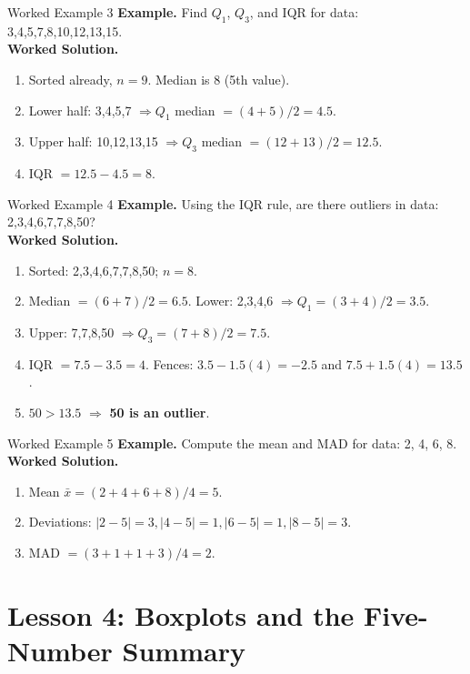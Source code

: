 \documentclass[aspectratio=169]{beamer}
\newcommand{\exampletitle}[1]{\vspace{0.25em}\textbf{Example.} #1\vspace{0.25em}}
\newcommand{\worked}{\textbf{Worked Solution.}}
\begin{document}
\begin{frame}{Worked Example 3}
\exampletitle{Find $Q_1$, $Q_3$, and IQR for data: 3,4,5,7,8,10,12,13,15.}\\[0.25em]
\worked
\begin{enumerate}
  \item Sorted already, $n=9$. Median is 8 (5th value).
  \item Lower half: 3,4,5,7 $\Rightarrow Q_1$ median $=(4+5)/2=4.5$.
  \item Upper half: 10,12,13,15 $\Rightarrow Q_3$ median $=(12+13)/2=12.5$.
  \item IQR $=12.5-4.5=8$.
\end{enumerate}
\end{frame}

\begin{frame}{Worked Example 4}
\exampletitle{Using the IQR rule, are there outliers in data: 2,3,4,6,7,7,8,50?}\\[0.25em]
\worked
\begin{enumerate}
  \item Sorted: 2,3,4,6,7,7,8,50; $n=8$.
  \item Median $=(6+7)/2=6.5$. Lower: 2,3,4,6 $\Rightarrow Q_1=(3+4)/2=3.5$.
  \item Upper: 7,7,8,50 $\Rightarrow Q_3=(7+8)/2=7.5$.
  \item IQR $=7.5-3.5=4$. Fences: $3.5-1.5(4)=-2.5$ and $7.5+1.5(4)=13.5$.
  \item $50>13.5$ $\Rightarrow$ \textbf{50 is an outlier}.
\end{enumerate}
\end{frame}

\begin{frame}{Worked Example 5}
\exampletitle{Compute the mean and MAD for data: 2, 4, 6, 8.}\\[0.25em]
\worked
\begin{enumerate}
  \item Mean $\bar{x}=(2+4+6+8)/4=5$.
  \item Deviations: $|2-5|=3, |4-5|=1, |6-5|=1, |8-5|=3$.
  \item MAD $=(3+1+1+3)/4=2$.
\end{enumerate}
\end{frame}

\section{Lesson 4: Boxplots and the Five-Number Summary}
\end{document}
